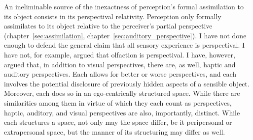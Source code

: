 An ineliminable source of the inexactness of perception's formal assimilation to its object consists in its perspectival relativity. Perception only formally assimilates to its object relative to the perceiver's partial perspective (chapter~\ref{sec:assimilation}, chapter~\ref{sec:auditory_perspective}). I have not done enough to defend the general claim that all sensory experience is perspectival. I have not, for example, argued that olfaction is perspectival. I have, however, argued that, in addition to visual perspectives, there are, as well, haptic and auditory perspectives. Each allows for better or worse perspectives, and each involves the potential disclosure of previously hidden aspects of a sensible object. Moreover, each does so in an ego-centrically structured space. While there are similarities among them in virtue of which they each count as perspectives, haptic, auditory, and visual perspectives are also, importantly, distinct. While each structures a space, not only may the space differ, be it peripersonal or extrapersonal space, but the manner of its structuring may differ as well.

